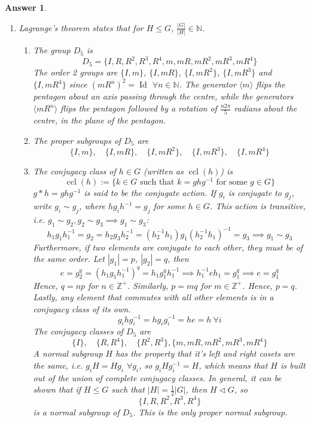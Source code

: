 \documentclass[a4paper]{article}
\DeclareMathOperator{\ccl}{ccl}
\DeclareMathOperator{\Id}{Id}
\newtheorem{ans}{Answer}[section]
\theoremstyle{new}
\begin{document}
\begin{ans}\leavevmode
\begin{enumerate}[label=(\roman*)]
\item Lagrange's theorem states that for $H\leq G$, $\frac{|G|}{|H|}\in\mathbb{N}$.
\begin{enumerate}[label=(\alph*)]
\item The group $D_5$ is
$$D_5=\{I,R,R^2,R^3,R^4,m,mR,mR^2,mR^3,mR^4\}$$
The order 2 groups are $\{I,m\}$, $\{I,mR\}$, $\{I,mR^2\}$, $\{I,mR^3\}$ and $\{I,mR^4\}$ since $(mR^n)^2=\Id$ $\forall n\in\mathbb{N}$. The generator $\langle m\rangle$ flips the pentagon about an axis passing through the centre, while the generators $\langle mR^n\rangle$ flips the pentagon followed by a rotation of $\frac{n2\pi}{5}$ radians about the centre, in the plane of the pentagon.
\item The proper subgroups of $D_5$ are
$$\{I,m\},\quad\{I,mR\},\quad\{I,mR^2\},\quad\{I,mR^3\},\quad\{I,mR^4\}$$
\item The conjugacy class of $h\in G$ (written as $\ccl(h)$) is
$$\ccl(h):=\{k\in G\text{ such that }k=ghg^{-1}\text{ for some }g\in G\}$$
$g*h=ghg^{-1}$ is said to be the conjugate action. If $g_i$ is conjugate to $g_j$, write $g_i\sim g_j$, where $hg_ih^{-1}=g_j$ for some $h\in G$. This action is transitive, i.e. $g_1\sim g_2,g_2\sim g_3\implies g_1\sim g_3$:
$$h_1g_1h_1^{-1}=g_2=h_2g_3h_2^{-1}=(h_2^{-1}h_1)g_1(h_2^{-1}h_1)^{-1}=g_3\implies g_1\sim g_3$$
Furthermore, if two elements are conjugate to each other, they must be of the same order. Let $|g_1|=p$, $|g_2|=q$, then
$$e=g_2^q=(h_1g_1h_1^{-1})^q=h_1g_1^qh_1^{-1}\implies h_1^{-1}eh_1=g_1^q\implies e=g_1^q$$
Hence, $q=np$ for $n\in\mathbb{Z}^+$. Similarly, $p=mq$ for $m\in\mathbb{Z}^+$. Hence, $p=q$.\\[5pt]
Lastly, any element that commutes with all other elements is in a conjugacy class of its own.
$$g_ihg_i^{-1}=hg_ig_i^{-1}=he=h~\forall i$$
The conjugacy classes of $D_5$ are
$$\{I\},\quad\{R,R^4\},\quad\{R^2,R^3\},\{m,mR,mR^2,mR^3,mR^4\}$$
A normal subgroup $H$ has the property that it's left and right cosets are the same, i.e. $g_iH=Hg_i$ $\forall g_i$, so $g_iHg_i^{-1}=H$, which means that $H$ is built out of the union of complete conjugacy classes. In general, it can be shown that if $H\leq G$ such that $|H|=\frac{1}{2}|G|$, then $H\lhd G$, so
$$\{I,R,R^2,R^3,R^4\}$$
is a normal subgroup of $D_5$. This is the only proper normal subgroup.
\end{enumerate}
\end{enumerate}
\end{ans}
\end{document}
